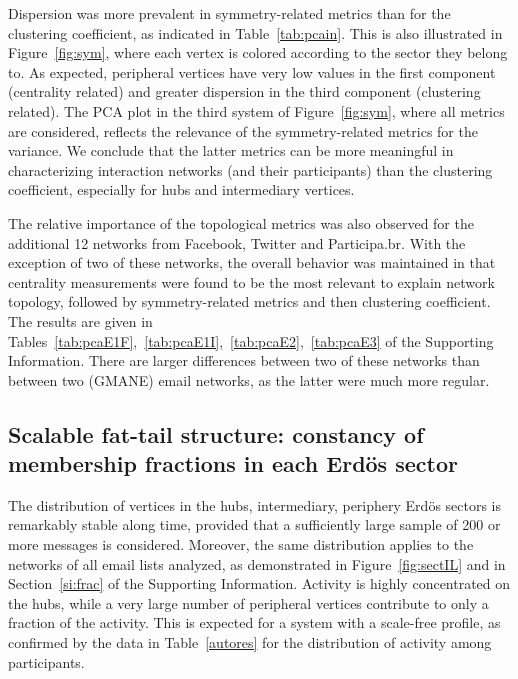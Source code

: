 \documentclass[%
	aip,
	jmp,%
	amsmath,amssymb,
	reprint,%
]{revtex4-1}
\begin{document}
Dispersion was more prevalent in symmetry-related metrics than for the clustering coefficient, as indicated in Table~\ref{tab:pcain}. This is also illustrated in Figure~\ref{fig:sym}, where each vertex is colored according to the sector they belong to. As expected, peripheral vertices have very low values in the first component (centrality related) and greater dispersion in the third component (clustering related).
The PCA plot in the third system of Figure~\ref{fig:sym}, where all metrics are considered, reflects the relevance of the symmetry-related metrics for the variance.
We conclude that the latter metrics can be more meaningful in characterizing interaction networks (and their participants) than the clustering coefficient, especially for hubs and intermediary vertices.

The relative importance of the topological metrics was also observed for the additional 12 networks from Facebook, Twitter and Participa.br. With the exception of two of these networks, the overall behavior was maintained in that centrality measurements were found to be the most relevant to explain network topology, followed by symmetry-related metrics and then clustering coefficient. The results are given in Tables~\ref{tab:pcaE1F},~\ref{tab:pcaE1I},~\ref{tab:pcaE2},~\ref{tab:pcaE3} of the Supporting Information. There are larger differences between two of these networks than between two (GMANE) email networks, as the latter were much more regular.

\subsection{Scalable fat-tail structure: constancy of membership fractions in each Erd\"os sector}\label{subsec:pih}

The distribution of vertices in the hubs, intermediary, periphery Erd\"os sectors is remarkably stable along time, provided that a sufficiently large sample of 200 or more messages is considered. 
Moreover, the same distribution applies to the networks of all email lists analyzed, as demonstrated in Figure~\ref{fig:sectIL} and in Section~\ref{si:frac} of the Supporting Information. 
Activity is highly concentrated on the hubs, while a very large number of peripheral vertices contribute to only a fraction of the activity. This is expected for a system with a scale-free profile, as confirmed by the data in Table~\ref{autores} for the distribution of activity among participants.
\end{document}
